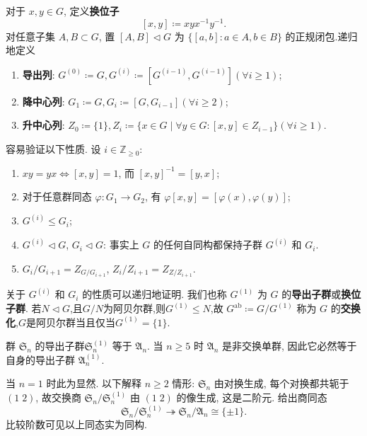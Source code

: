 \begin{definition}
	对于 $x, y \in G$, 定义\textbf{换位子}
	\[ [x,y] \coloneqq xyx^{-1}y^{-1}. \]
	对任意子集 $A, B \subset G$, 置 $[A, B] \lhd G$ 为 $\{[a,b] : a \in A, b \in B\}$ 的正规闭包.递归地定义
	\begin{enumerate}
		\item \textbf{导出列}: $G^{(0)} \coloneqq G, G^{(i)} \coloneqq [G^{(i-1)}, G^{(i-1)}](\forall i\geqslant1)$;
		\item \textbf{降中心列}: $G_1 \coloneqq G, G_i \coloneqq [G, G_{i-1}](\forall i\geqslant2)$;
		\item \textbf{升中心列}: $Z_0 \coloneqq \{1\},Z_{i} \coloneqq \{x\in G \mid \forall y\in G:[x,y] \in Z_{i-1} \}(\forall i\geqslant1)$.
	\end{enumerate}
\end{definition}
容易验证以下性质. 设 $i \in \mathbb{Z}_{\geq 0}$:
\begin{enumerate}
	\item $xy=yx \iff [x,y]=1$, 而 $[x,y]^{-1} = [y,x]$;
	\item 对于任意群同态 $\varphi: G_1 \to G_2$, 有 $\varphi [x,y] = [\varphi(x), \varphi(y)]$;
	\item $G^{(i)} \leqslant G_i$;
	\item $G^{(i)} \lhd G$, $G_i \lhd G$: 事实上 $G$ 的任何自同构都保持子群 $G^{(i)}$ 和 $G_i$.
	\item $G_i/G_{i+1} = Z_{G/G_{i+1}}$, $Z_i/Z_{i+1} = Z_{Z/Z_{i+1}}$.
\end{enumerate}

关于 $G^{(i)}$ 和 $G_i$ 的性质可以递归地证明. 我们也称 $G^{(1)}$ 为 $G$ 的\textbf{导出子群}或\textbf{换位子群}. 若$N\lhd G$,且$G/N$为阿贝尔群,则$G^{(1)}\leqslant N$,故 $G^\text{ab} \coloneqq G/G^{(1)}$ 称为 $G$ 的\textbf{交换化},$G$是阿贝尔群当且仅当$G^{(1)}=\{1\}$.

\begin{example}
	群 $\mathfrak{S}_n$ 的导出子群$\mathfrak{S}_n^{(1)}$ 等于 $\mathfrak{A}_n$. 当 $n \geqslant 5$ 时 $\mathfrak{A}_n$ 是非交换单群, 因此它必然等于自身的导出子群 $\mathfrak{A}_n^{(1)}$.
	
	当 $n=1$ 时此为显然. 以下解释 $n \geq 2$ 情形: $\mathfrak{S}_n$ 由对换生成, 每个对换都共轭于 $(1 \; 2)$, 故交换商 $\mathfrak{S}_n / \mathfrak{S}_n^{(1)}$ 由 $(1 \; 2)$ 的像生成, 这是二阶元. 给出商同态
	\[ \mathfrak{S}_n / \mathfrak{S}_n^{(1)} \twoheadrightarrow \mathfrak{S}_n/\mathfrak{A}_n \cong \{ \pm 1\}. \]
	比较阶数可见以上同态实为同构.
\end{example}
